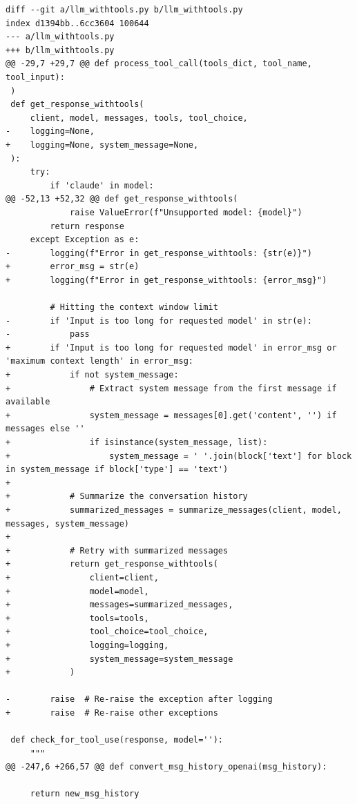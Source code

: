 \documentclass{article} %
\begin{document}
\begin{lstlisting}[style=diffstyle]
diff --git a/llm_withtools.py b/llm_withtools.py
index d1394bb..6cc3604 100644
--- a/llm_withtools.py
+++ b/llm_withtools.py
@@ -29,7 +29,7 @@ def process_tool_call(tools_dict, tool_name, tool_input):
 )
 def get_response_withtools(
     client, model, messages, tools, tool_choice,
-    logging=None,
+    logging=None, system_message=None,
 ):
     try:
         if 'claude' in model:
@@ -52,13 +52,32 @@ def get_response_withtools(
             raise ValueError(f"Unsupported model: {model}")
         return response
     except Exception as e:
-        logging(f"Error in get_response_withtools: {str(e)}")
+        error_msg = str(e)
+        logging(f"Error in get_response_withtools: {error_msg}")
 
         # Hitting the context window limit
-        if 'Input is too long for requested model' in str(e):
-            pass
+        if 'Input is too long for requested model' in error_msg or 'maximum context length' in error_msg:
+            if not system_message:
+                # Extract system message from the first message if available
+                system_message = messages[0].get('content', '') if messages else ''
+                if isinstance(system_message, list):
+                    system_message = ' '.join(block['text'] for block in system_message if block['type'] == 'text')
+
+            # Summarize the conversation history
+            summarized_messages = summarize_messages(client, model, messages, system_message)
+            
+            # Retry with summarized messages
+            return get_response_withtools(
+                client=client,
+                model=model,
+                messages=summarized_messages,
+                tools=tools,
+                tool_choice=tool_choice,
+                logging=logging,
+                system_message=system_message
+            )
 
-        raise  # Re-raise the exception after logging
+        raise  # Re-raise other exceptions
 
 def check_for_tool_use(response, model=''):
     """
@@ -247,6 +266,57 @@ def convert_msg_history_openai(msg_history):
 
     return new_msg_history
 

\end{lstlisting}
\end{document}
